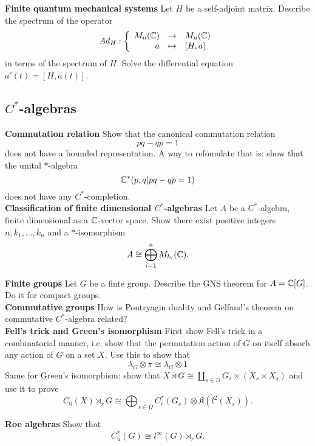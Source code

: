 \textbf{Finite quantum mechanical systems} Let $H$ be a self-adjoint matrix. Describe the spectrum of the operator
\[Ad_{H}:\left\{\begin{array}{rcl} M_n(\mathbb C) & \rightarrow & M_n(\mathbb C) \\ a & \mapsto & [H,a] \end{array}\right.\]
in terms of the spectrum of $H$. Solve the differential equation $a'(t) = [H,a(t)]$.\\

\subsection{$C^*$-algebras}

\textbf{Commutation relation} Show that the canonical commutation relation \[ pq-qp = 1\]
does not have a bounded representation. A way to refomulate that is: show that the unital $*$-algebra 
\[ \mathbb C^*( p,q | pq-qp =1)\]
does not have any $C^*$-completion.\\

\textbf{Classification of finite dimensional $C^*$-algebras} Let $A$ be a $C^*$-algebra, finite dimensional as a $\mathbb C$-vector space. Show there exist positive integers $n,k_1,...,k_n$ and a $*$-isomorphism
\[A\cong \bigoplus_{i=1}^n M_{k_i}(\mathbb C).\]

\textbf{Finite groups} Let $G$ be a finte group. Describe the GNS theorem for $A=\mathbb C[G]$. Do it for compact groups.\\

\textbf{Commutative groups} How is Pontryagin duality and Gelfand's theorem on commutative $C^*$-algebra related?\\

\textbf{Fell's trick and Green's isomorphism}
First show Fell's trick in a combinatorial manner, i.e. show that the permutation action of $G$ on itself absorb any action of $G$ on a set $X$. Use this to show that 
\[\lambda_G \otimes \pi \cong \lambda_G \otimes 1\]
Same for Green's isomorphism: show that $X\rtimes G \cong \coprod_{s\in \Omega} G_s\times (X_s\times X_s)$ and use it to prove
\[C_0(X)\rtimes_r G \cong \bigoplus_{s\in \Omega} C^*_r(G_s)\otimes \mathfrak K(l^2(X_s)). \]

\textbf{Roe algebras}
Show that 
\[C^*_u(G) \cong l^\infty(G)\rtimes_r G.\]

 
